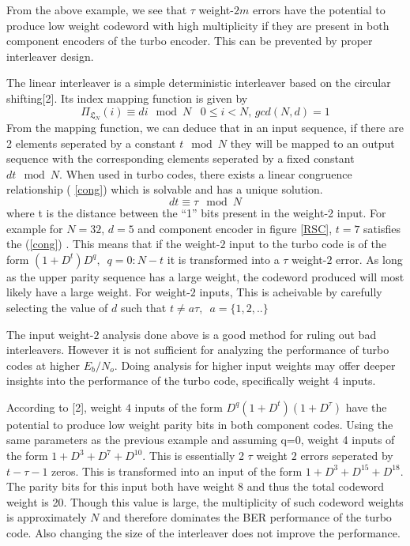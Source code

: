 \documentclass[technicalreport]{ieicej}
\begin{document}
 From the above example, we see that $\tau$ weight-$2m$ errors have the potential to
produce low weight codeword with high multiplicity if they are present in both 
component encoders of the turbo encoder. This can be prevented by proper interleaver
 design.
 
The linear interleaver is a simple deterministic interleaver based on the circular shifting[2].
Its index mapping function is given by 
\begin{equation}
 \Pi_{\mathfrak{L}_N}(i) \equiv di \mod N \,\,\,\,\, 0 \leq i < N, \, gcd(N,d)=1
\end{equation}
From the mapping function, we can deduce that in an input sequence,
if there are 2 elements seperated by
a constant $t\mod N$ they will be mapped to an output sequence with the corresponding
elements seperated by a fixed constant $dt \mod N$. When used in turbo codes, there
exists a linear congruence relationship ( \ref{cong}) 
which is solvable and has a unique solution.
 \begin{equation} 
 dt \equiv \tau \mod N
 \label{cong}
 \end{equation}
where t is the distance between the ``1'' bits present in the weight-2 input.
For example for $N=32$, $d=5$ and component encoder in figure \ref{RSC}, 
$t=7$ satisfies the (\ref{cong}) . This means
that if the weight-$2$ input to the turbo code is of the form $(1+D^t)D^q,
\,\,\, q=0:N-t$ it is transformed
into a $\tau$ weight-$2$ error. As long as the upper parity sequence has a large weight,
the codeword produced will most likely have a large weight. For weight-$2$ inputs,
This is acheivable by 
carefully selecting the value of $d$ such that $t\neq a\tau,\,\,\, a=\{1,2,..\}$

The input weight-$2$ analysis done above is a good method for ruling out bad interleavers.
However it is not sufficient for analyzing the performance of turbo codes at higher
$E_b/ N_o$. Doing analysis for higher input weights may offer deeper insights into
the performance of the turbo code, specifically weight $4$ inputs.

According to [2], weight $4$ inputs of the form $D^q(1+D^t)(1+D^{\tau})$
have the potential to produce low weight parity bits in both component codes. Using the 
same parameters as the previous example and assuming q=0, weight 4 inputs of the
form  $1+D^3+D^7 +D^{10}$.
This is essentially 2 $\tau$ weight $2$ errors seperated by $t-\tau -1$ zeros. This 
is transformed into an input of the form $1+D^3+D^{15}+D^{18}$. The parity
bits for this input both have weight 8 and thus the total codeword weight is 20.
Though this value is large, the multiplicity of such codeword weights is approximately
$N$ and therefore dominates the BER performance of the turbo code. Also changing the
size of the interleaver does not improve the performance.
\end{document}
